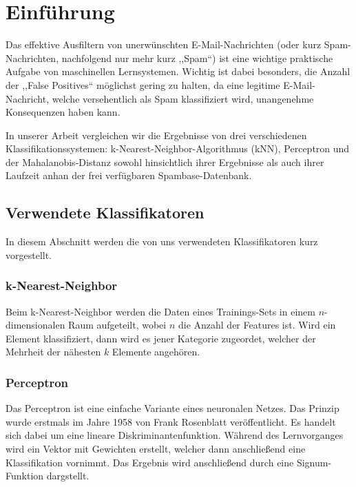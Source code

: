 \chapter{Einführung}
\label{ch:einfuehrung}

Das effektive Ausfiltern von unerwünschten E-Mail-Nachrichten (oder kurz Spam-Nachrichten, nachfolgend nur mehr kurz ,,Spam``) ist eine wichtige praktische Aufgabe von maschinellen Lernsystemen. Wichtig ist dabei besonders, die Anzahl der ,,False Positives`` möglichst gering zu halten, da eine legitime E-Mail-Nachricht, welche versehentlich als Spam klassifiziert wird, unangenehme Konsequenzen haben kann.

In unserer Arbeit vergleichen wir die Ergebnisse von drei verschiedenen Klassifikationssystemen: k-Nearest-Neighbor-Algorithmus (kNN), Perceptron und der Mahalanobis-Distanz sowohl hinsichtlich ihrer Ergebnisse als auch ihrer Laufzeit anhan der frei verfügbaren Spambase-Datenbank.

\section{Verwendete Klassifikatoren}

In diesem Abschnitt werden die von uns verwendeten Klassifikatoren kurz vorgestellt.

\subsection{k-Nearest-Neighbor}

Beim k-Nearest-Neighbor werden die Daten eines Trainings-Sets in einem $n$-dimensionalen Raum aufgeteilt, wobei $n$ die Anzahl der Features ist. Wird ein Element klassifiziert, dann wird es jener Kategorie zugeordet, welcher der Mehrheit der nähesten $k$ Elemente angehören.

\subsection{Perceptron}

Das Perceptron ist eine einfache Variante eines neuronalen Netzes. Das Prinzip wurde erstmals im Jahre 1958 von Frank Rosenblatt veröffentlicht\cite{rosenblatt58}. Es handelt sich dabei um eine lineare Diskriminantenfunktion. Während des Lernvorganges wird ein Vektor mit Gewichten erstellt, welcher dann anschließend eine Klassifikation vornimmt. Das Ergebnis wird anschließend durch eine Signum-Funktion dargstellt.

